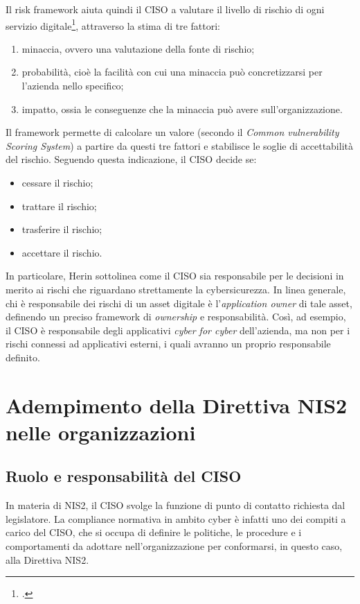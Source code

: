 Il risk framework aiuta quindi il CISO a valutare il livello di rischio di ogni
servizio digitale\footcite[pp. 40--42]{kouns-ciso}, attraverso la stima di tre fattori:
\begin{enumerate}
    \item minaccia, ovvero una valutazione della fonte di rischio;
    \item probabilità, cioè la facilità con cui una minaccia può concretizzarsi
    per l'azienda nello specifico;
    \item impatto, ossia le conseguenze che la minaccia può avere sull'organizzazione.
\end{enumerate}
Il framework permette di calcolare un valore (secondo il \textit{Common vulnerability
Scoring System}) a partire da questi tre fattori e stabilisce le soglie di
accettabilità del rischio. Seguendo questa indicazione, il CISO decide se:
\begin{itemize}
    \item cessare il rischio;
    \item trattare il rischio;
    \item trasferire il rischio;
    \item accettare il rischio.
\end{itemize}
In particolare, Herin sottolinea come il CISO sia responsabile per le decisioni
in merito ai rischi che riguardano strettamente la cybersicurezza. In linea generale, chi è responsabile 
dei rischi di un asset digitale è l'\textit{application owner} di tale asset, definendo
un preciso framework di \textit{ownership} e responsabilità. Così, ad esempio,
il CISO è responsabile degli applicativi \textit{cyber for cyber} dell'azienda,
ma non per i rischi connessi ad applicativi esterni, i quali avranno un proprio
responsabile definito.



\section{Adempimento della Direttiva NIS2 nelle organizzazioni}
\subsection{Ruolo e responsabilità del CISO}
In materia di NIS2, il CISO svolge la funzione di punto di contatto richiesta
dal legislatore. La compliance normativa in ambito cyber è infatti uno dei
compiti a carico del CISO, che si occupa di definire le politiche, le procedure
e i comportamenti da adottare nell'organizzazione per conformarsi, in questo caso, alla Direttiva NIS2.

